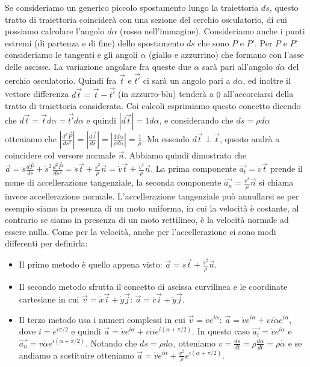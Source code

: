 Se consideriamo un generico piccolo spostamento lungo la traiettoria $ds$, questo tratto di traiettoria coinciderà con una sezione del cerchio osculatorio, di cui possiamo calcolare l'angolo $d\alpha$ (rosso nell'immagine). Consideriamo anche i punti estremi (di partenza e di fine) dello spostamento $ds$ che sono $P$ e $P'$. Per $P$ e $P'$ consideriamo le tangenti e gli angoli $\alpha$ (giallo e azzurrino) che formano con l'asse delle ascisse. La variazione angolare fra queste due $\alpha$ sarà pari all'angolo $d \alpha$ del cerchio osculatorio. Quindi fra $\vec{t}$ e $\vec{t'}$ ci sarà un angolo pari a $d \alpha$, ed inoltre il vettore differenza $d \vec{t} = \vec{t} - \vec{t'}$ (in azzurro-blu) tenderà a $0$ all'accorciarsi della tratto di traiettoria considerata. Coi calcoli esprimiamo questo concetto dicendo che $d \vec{t} = \vec{t} d \alpha = \vec{t'} d \alpha$ e quindi $|d \vec{t}| = 1 d \alpha$, e considerando che $ds = \rho d \alpha$ otteniamo che $\left|\frac{d^2 \vec{P}}{ds^2}\right| = \left| \frac{d \vec{t}}{ds} \right| = \left| \frac{1 d \alpha}{\rho d \alpha} \right| = \frac{1}{\rho}$. Ma essendo $d \vec{t} \perp \vec{t}$, questo andrà a coincidere col versore normale $\vec{n}$.\newline
Abbiamo quindi dimostrato che $\vec{a} = \ddot{s} \frac{d \vec{P}}{ds} + \dot{s}^2 \frac{d^2 \vec{P}}{ ds^2} = \ddot{s} \vec{t} + \frac{ \dot{s}^2}{\rho}\vec{n} = \dot{v} \vec{t} + \frac{v^2}{\rho}\vec{n}$. La prima componente $\vec{a_t} = \dot{v} \vec{t}$ prende il nome di accellerazione tangenziale, la seconda componente $\vec{a_n} = \frac{v^2}{\rho}\vec{n}$ si chiama invece accellerazione normale. L'accellerazione tangenziale può annullarsi se per esempio siamo in presenza di un moto uniforma, in cui la velocità è costante, al contrario se siamo in presenza di un moto rettilineo, è la velocità normale ad essere nulla.\newline
Come per la velocità, anche per l'accellerazione ci sono modi differenti per definirla:
\begin{itemize}
    \item Il primo metodo è quello appena visto: $\vec{a} = \ddot{s} \vec{t} + \frac{\dot{s}^2}{\rho} \vec{n}$.
    \item Il secondo metodo sfrutta il concetto di ascissa curvilinea e le coordinate cartesiane in cui $\vec{v} = \dot{x} \vec{i} + \dot{y} \vec{j}$: $\vec{a} = \ddot{c} \vec{i} + \ddot{y} \vec{j}$.
    \item Il terzo metodo usa i numeri complessi in cui $\vec{v} = v e^{i \alpha}$: $\vec{a} = \dot{v} e^{i \alpha} + v i \dot{\alpha} e^{i \alpha}$, dove $i = e^{i \pi/2}$ e quindi $\vec{a} = \dot{v} e^{i \alpha} + v \dot{\alpha} e^{i(\alpha + \pi/2)}$. In questo caso $\vec{a_t} = \dot{v} e^{i \alpha}$ e $\vec{a_n} = v \dot{\alpha} e^{i(\alpha + \pi/2)}$. Notando che $ds = \rho d \alpha$, otteniamo $v = \frac{ds}{dt} = \rho \frac{d \alpha}{dt} = \rho \dot{\alpha}$ e se andiamo a sostituire otteniamo $\vec{a} = \dot{v} e^{i \alpha} + \frac{v^2}{\rho} e^{i(\alpha + \pi/2)}$.
\end{itemize}
